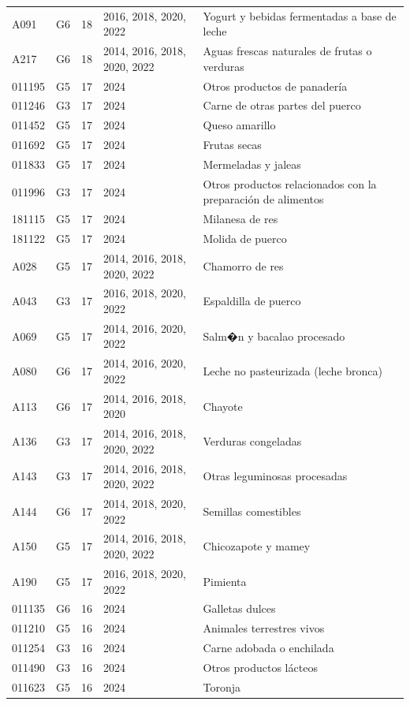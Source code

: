 \begin{table}[ht]
\begin{tabular}{llrll}
  A091 & G6 &  18 & 2016, 2018, 2020, 2022 & Yogurt y bebidas fermentadas a base de leche \\ 
  A217 & G6 &  18 & 2014, 2016, 2018, 2020, 2022 & Aguas frescas naturales de frutas o verduras \\ 
  011195 & G5 &  17 & 2024 & Otros productos de panadería \\ 
  011246 & G3 &  17 & 2024 & Carne de otras partes del puerco \\ 
  011452 & G5 &  17 & 2024 & Queso amarillo \\ 
  011692 & G5 &  17 & 2024 & Frutas secas \\ 
  011833 & G5 &  17 & 2024 & Mermeladas y jaleas \\ 
  011996 & G3 &  17 & 2024 & Otros productos relacionados con la preparación de alimentos \\ 
  181115 & G5 &  17 & 2024 & Milanesa de res \\ 
  181122 & G5 &  17 & 2024 & Molida de puerco \\ 
  A028 & G5 &  17 & 2014, 2016, 2018, 2020, 2022 & Chamorro de res \\ 
  A043 & G3 &  17 & 2016, 2018, 2020, 2022 & Espaldilla de puerco \\ 
  A069 & G5 &  17 & 2014, 2016, 2020, 2022 & Salm�n y bacalao procesado \\ 
  A080 & G6 &  17 & 2014, 2016, 2020, 2022 & Leche no pasteurizada (leche bronca) \\ 
  A113 & G6 &  17 & 2014, 2016, 2018, 2020 & Chayote \\ 
  A136 & G3 &  17 & 2014, 2016, 2018, 2020, 2022 & Verduras congeladas \\ 
  A143 & G3 &  17 & 2014, 2016, 2018, 2020, 2022 & Otras leguminosas procesadas \\ 
  A144 & G6 &  17 & 2014, 2018, 2020, 2022 & Semillas comestibles \\ 
  A150 & G5 &  17 & 2014, 2016, 2018, 2020, 2022 & Chicozapote y mamey \\ 
  A190 & G5 &  17 & 2016, 2018, 2020, 2022 & Pimienta \\ 
  011135 & G6 &  16 & 2024 & Galletas dulces \\ 
  011210 & G5 &  16 & 2024 & Animales terrestres vivos \\ 
  011254 & G3 &  16 & 2024 & Carne adobada o enchilada \\ 
  011490 & G3 &  16 & 2024 & Otros productos lácteos \\ 
  011623 & G5 &  16 & 2024 & Toronja \\ 

\end{tabular}
\end{table}
